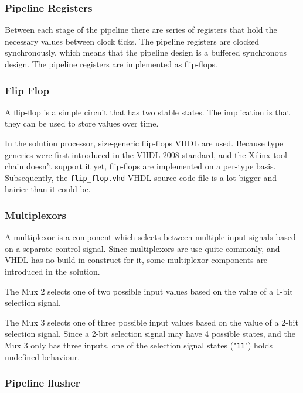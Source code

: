 \subsubsection{Pipeline Registers}

Between each stage of the pipeline there are series of registers that hold the necessary values between clock ticks.
The pipeline registers are clocked synchronously, which means that the pipeline design is a buffered synchronous design.
The pipeline registers are implemented as flip-flops.


\subsubsection{Flip Flop}

A flip-flop is a simple circuit that has two stable states.
The implication is that they can be used to store values over time.

In the solution processor, size-generic flip-flops VHDL are used.
Because type generics were first introduced in the VHDL 2008 standard\cite{vhdl2008}, and the Xilinx tool chain doesn't support it yet, flip-flops are implemented on a per-type basis.
Subsequently, the \texttt{flip\_flop.vhd} VHDL source code file is a lot bigger and hairier than it could be.

\subsubsection{Multiplexors}

A multiplexor is a component which selects between multiple input signals based on a separate control signal.
Since multiplexors are use quite commonly, and VHDL has no build in construct for it, some multiplexor components are introduced in the solution.


The Mux 2 selects one of two possible input values based on the value of a 1-bit selection signal.


The Mux 3 selects one of three possible input values based on the value of a 2-bit selection signal.
Since a 2-bit selection signal may have 4 possible states, and the Mux 3 only has three inputs, one of the selection signal states ("\texttt{11}") holds undefined behaviour.

\subsubsection{Pipeline flusher}

